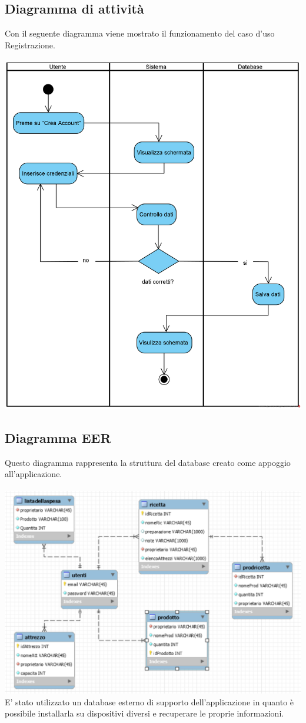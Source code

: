 \documentclass[a4paper, titlepage]{article}
\begin{document}
\subsection{Diagramma di attività}
Con il seguente diagramma viene mostrato il funzionamento del caso d'uso Registrazione.\\\\
\includegraphics[scale=0.50]{Immagini/Activity Diagram Registrazione_Brew Day!.png}
\subsection{Diagramma EER}
Questo diagramma rappresenta la struttura del database creato come appoggio all'applicazione.\\\\
\includegraphics[scale=0.50]{Immagini/diagrammaER.PNG}
\\E' stato utilizzato un database esterno di supporto dell'applicazione in quanto è possibile installarla su dispositivi diversi e recuperare le proprie informazioni.
\newpage
\end{document}

